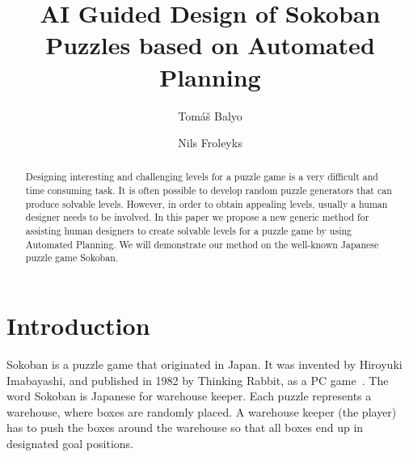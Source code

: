 \documentclass[runningheads]{llncs}
\begin{document}
%
\title{AI Guided Design of Sokoban Puzzles based on Automated Planning}
%
%
\author{Tom\'a\v{s} Balyo \and
Nils Froleyks}
%
%
%
\maketitle              %

\newcommand{\sokoimg}[1]{\texttt{[image: \#1]} \hspace{-0.30em}}

\newcommand{\w}{\sokoimg{figures/wall.pdf}}
\newcommand{\e}{\sokoimg{figures/empty.pdf}}
\newcommand{\p}{\sokoimg{figures/player.pdf}}
\newcommand{\x}{\sokoimg{figures/box.pdf}}
\newcommand{\g}{\sokoimg{figures/goal.pdf}}
\newcommand{\h}{\sokoimg{figures/goalbox.pdf}}
\newcommand{\n}{\\
\vspace{-0.1em}}

%
\begin{abstract}
Designing interesting and challenging levels for a puzzle game is a very difficult and time
consuming task. It is often possible to develop random puzzle generators that can produce
solvable levels. However, in order to obtain appealing levels, usually a human designer 
needs to be involved. In this paper we propose a new generic method for assisting human
designers to create solvable levels for a puzzle game by using Automated Planning. 
We will demonstrate our method on the well-known Japanese puzzle game Sokoban.

\end{abstract}
%
%
%
\section{Introduction}
Sokoban is a puzzle game that originated in Japan. It was invented by Hiroyuki
Imabayashi, and published in 1982 by Thinking Rabbit, as a PC game~\cite{TODO}.
The word Sokoban is Japanese for warehouse keeper.
Each puzzle represents a warehouse, where boxes are randomly placed. A warehouse
keeper (the player) has to push the boxes around the warehouse so that all boxes 
end up in designated goal positions.
\end{document}
